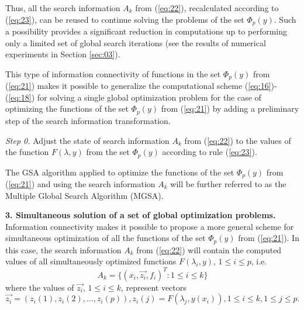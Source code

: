 \documentclass[runningheads]{llncs}
\begin{document}
Thus, all the search information $A_k$ from (\ref{eq:22}), recalculated according to (\ref{eq:23}), can be reused to continue solving the problems of the set $\Phi_p(y)$. Such a possibility provides a significant reduction in computations up to performing only a limited set of global search iterations (see the results of numerical experiments in Section \ref{sec:03}).

     This type of information connectivity of functions in the set $\Phi_p(y)$ from (\ref{eq:21}) makes it possible to generalize the computational scheme (\ref{eq:16})-(\ref{eq:18}) for solving a single global optimization problem for the case of optimizing the functions of the set $\Phi_p(y)$ from (\ref{eq:21}) by adding a preliminary step of the search information  transformation.

\textit{Step 0.} Adjust the state of search information $A_k$ from (\ref{eq:22}) to the values of the function $F(\lambda, y)$ from the set $\Phi_p(y)$ according to rule (\ref{eq:23}).

The GSA algorithm applied to optimize the functions of the set $\Phi_p(y)$ from (\ref{eq:21}) and using the search information $A_k$ will be further referred to as the Multiple Global Search Algorithm (MGSA).

\textbf{3. Simultaneous solution of a set of global optimization problems.} Information connectivity makes it possible to propose a more general scheme for simultaneous optimization of all the functions of the set $\Phi_p(y)$ from (\ref{eq:21}). In this case, the search information $A_k$ from (\ref{eq:22}) will contain the computed values of all simultaneously optimized functions $F(\lambda_i, y)$, $1 \leq i \leq p$, i.e. 
\begin{equation}
\label{eq:24}
A_k=\{(x_i,\overrightarrow{z_i},f_i )^T : 1 \leq i \leq k\}
\end{equation}
where the values of $\overrightarrow{z_i}$, $1 \leq i \leq k$, represent vectors 
\begin{equation}
\label{eq:25}
\overrightarrow{z_i}=( z_i (1),z_i (2), \dots ,z_i (p)),z_i (j)=F(\lambda_j,y(x_i)), 1\leq i \leq k,1\leq j\leq p.
\end{equation}
\end{document}
